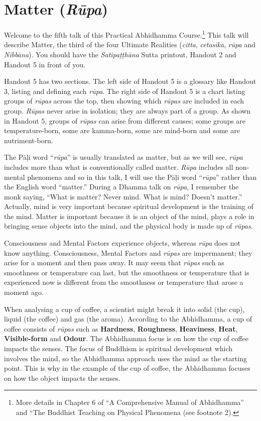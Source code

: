 \section{Matter (\textit{Rūpa})}

Welcome to the fifth talk of this Practical Abhidhamma Course.\footnote{More details in Chapter 6 of “A Comprehensive Manual of Abhidhamma” and “The Buddhist Teaching on Physical Phenomena (see footnote 2).} This talk will describe Matter, the third of the four Ultimate Realities (\textit{citta}, \textit{cetasika}, \textit{rūpa} and \textit{Nibbāna}). You should have the \textit{Satipaṭṭhāna} Sutta printout, Handout 2 and Handout 5 in front of you.

Handout 5 has two sections. The left side of Handout 5 is a glossary like Handout 3, listing and defining each \textit{rūpa}. The right side of Handout 5 is a chart listing groups of \textit{rūpas} across the top, then showing which \textit{rūpas} are included in each group. \textit{Rūpas} never arise in isolation; they are always part of a group. As shown in Handout 5, groups of \textit{rūpas} can arise from different causes; some groups are temperature-born, some are kamma-born, some are mind-born and some are nutriment-born.

The Pāḷi word “\textit{rūpa}” is usually translated as matter, but as we will see, \textit{rūpa} includes more than what is conventionally called matter. \textit{Rūpa} includes all non-mental phenomena and so in this talk, I will use the Pāḷi word “\textit{rūpa}” rather than the English word “matter.” During a Dhamma talk on \textit{rūpa}, I remember the monk saying, “What is matter? Never mind. What is mind? Doesn’t matter.” Actually, mind is very important because spiritual development is the training of the mind. Matter is important because it is an object of the mind, plays a role in bringing sense objects into the mind, and the physical body is made up of \textit{rūpas}.

Consciousness and Mental Factors experience objects, whereas \textit{rūpa} does not know anything. Consciousness, Mental Factors and \textit{rūpas} are impermanent; they arise for a moment and then pass away. It may seem that \textit{rūpas} such as smoothness or temperature can last, but the smoothness or temperature that is experienced now is different from the smoothness or temperature that arose a moment ago.

When analysing a cup of coffee, a scientist might break it into solid (the cup), liquid (the coffee) and gas (the aroma). According to the Abhidhamma, a cup of coffee consists of \textit{rūpas} such as \textbf{Hardness}, \textbf{Roughness}, \textbf{Heaviness}, \textbf{Heat}, \textbf{Visible-form} and \textbf{Odour}. The Abhidhamma focus is on how the cup of coffee impacts the senses. The focus of Buddhism is spiritual development which involves the mind, so the Abhidhamma approach uses the mind as the starting point. This is why in the example of the cup of coffee, the Abhidhamma focuses on how the object impacts the senses.

